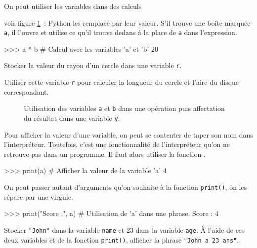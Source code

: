 On peut utiliser les variables dans des calculs {voir figure \ref{python:variables:figures:calculs}~:
Python les remplace par leur valeur. S'il
trouve une boîte marquée \texttt{a}, il l'ouvre et utilise ce qu'il trouve dedans à la place de
\texttt{a} dans l'expression.
\begin{pythoncode}
>>> a * b           # Calcul avec les variables 'a' et 'b'
20
\end{pythoncode}

\begin{exercice}
Stocker la valeur du rayon d'un cercle dans une variable \texttt{r}.

Utiliser cette variable \texttt{r} pour calculer la longueur du cercle et l'aire du disque
correspondant.
\end{exercice}

\begin{figure}[h]
\caption{Utilisation des variables \texttt{a} et \texttt{b} dans une opération
puis affectation du résultat dans une
variable \texttt{y}.\label{python:variables:figures:calculs}}
\centering
{}
\end{figure}

\begin{remarque}
Pour afficher la valeur d'une variable, on peut se contenter de taper son nom dans l'interpréteur.
Toutefois, c'est une fonctionnalité de l'interpréteur qu'on ne retrouve pas dans un programme.
Il faut alors utiliser la fonction .
\begin{pythoncode}
>>> print(a)                # Afficher la valeur de la variable 'a'
4
\end{pythoncode}
On peut passer autant d'arguments qu'on souhaite
à la fonction \texttt{print()}, on les sépare par une virgule.
\begin{pythoncode}
>>> print("Score :", a)     # Utilisation de 'a' dans une phrase.
Score : 4
\end{pythoncode}
\end{remarque}
\begin{exercice}
Stocker \texttt{"John"} dans la variable \texttt{name} et $23$ dans la variable \texttt{age}.
À l'aide de ces deux variables et de la fonction \texttt{print()}, afficher la phrase
\texttt{"John a 23 ans"}.
\end{exercice}

}
